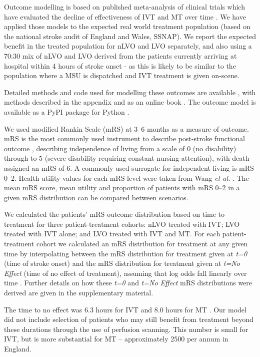 Outcome modelling is based on published meta-analysis of clinical trials which have evaluated the decline of effectiveness  of IVT and MT over time \cite{emberson_effect_2014, fransen_time_2016}. We have applied those models to the expected real world treatment population (based on the national stroke audit of England and Wales, SSNAP). We report the expected benefit in the treated population for nLVO and LVO separately, and also using a 70:30 mix of nLVO and LVO derived from the patients currently arriving at hospital within 4 hours of stroke onset - as this is likely to be similar to the population where a MSU is dispatched and IVT treatment is given on-scene. 

Detailed methods and code used for modelling these outcomes are available \cite{github2}, with methods described in the appendix and as an online book \cite{github3}. The outcome model is available as a PyPI package for Python \cite{pypi}.

We used modified Rankin Scale (mRS) at 3--6 months as a measure of outcome. mRS is the most commonly used instrument to describe post-stroke functional outcome \cite{quinn_functional_2009}, describing independence of living from a scale of 0 (no disability) through to 5 (severe disability requiring constant nursing attention), with death assigned an mRS of 6. A commonly used surrogate for independent living is mRS 0--2. Health utility values for each mRS level were taken from Wang \textit{et al.} \cite{wang_utility-weighted_2020}. The mean mRS score, mean utility and proportion of patients with mRS 0--2 in a given mRS distribution can be compared between scenarios.

We calculated the patients' mRS outcome distribution based on time to treatment for three patient-treatment cohorts: nLVO treated with IVT; LVO treated with IVT alone; and LVO treated with IVT and MT. For each patient-treatment cohort we calculated an mRS distribution for treatment at any given time by interpolating between the mRS distribution for treatment given at \emph{t=0} (time of stroke onset) and the mRS distribution for treatment given at \emph{t=No Effect} (time of no effect of treatment), assuming that log odds fall linearly over time \cite{emberson_effect_2014, fransen_time_2016}. Further details on how these \emph{t=0} and \emph{t=No Effect} mRS distributions were derived are given in the supplementary material.

The time to no effect was 6.3 hours for IVT \cite{emberson_effect_2014} and 8.0 hours for MT \cite{ fransen_time_2016}. Our model did not include selection of patients who may still benefit from treatment beyond these durations through the use of perfusion scanning. This number is small for IVT, but is more substantial for MT – approximately 2500 per annum in England. 

